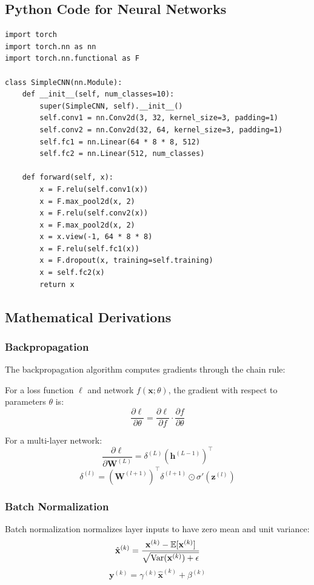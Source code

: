 \documentclass{article}
\begin{document}
\subsection{Python Code for Neural Networks}

\begin{verbatim}
import torch
import torch.nn as nn
import torch.nn.functional as F

class SimpleCNN(nn.Module):
    def __init__(self, num_classes=10):
        super(SimpleCNN, self).__init__()
        self.conv1 = nn.Conv2d(3, 32, kernel_size=3, padding=1)
        self.conv2 = nn.Conv2d(32, 64, kernel_size=3, padding=1)
        self.fc1 = nn.Linear(64 * 8 * 8, 512)
        self.fc2 = nn.Linear(512, num_classes)

    def forward(self, x):
        x = F.relu(self.conv1(x))
        x = F.max_pool2d(x, 2)
        x = F.relu(self.conv2(x))
        x = F.max_pool2d(x, 2)
        x = x.view(-1, 64 * 8 * 8)
        x = F.relu(self.fc1(x))
        x = F.dropout(x, training=self.training)
        x = self.fc2(x)
        return x
\end{verbatim}

\subsection{Mathematical Derivations}

\subsubsection{Backpropagation}

The backpropagation algorithm computes gradients through the chain rule:

For a loss function $\ell$ and network $f(\mathbf{x}; \theta)$, the gradient
with respect to parameters $\theta$ is:
\[
\frac{\partial \ell}{\partial \theta} = \frac{\partial \ell}{\partial f} \cdot \frac{\partial f}{\partial \theta}
\]

For a multi-layer network:
\[
\frac{\partial \ell}{\partial \mathbf{W}^{(L)}} = \delta^{(L)} (\mathbf{h}^{(L-1)})^\top
\]
\[
\delta^{(l)} = (\mathbf{W}^{(l+1)})^\top \delta^{(l+1)} \odot \sigma'(\mathbf{z}^{(l)})
\]

\subsubsection{Batch Normalization}

Batch normalization normalizes layer inputs to have zero mean and unit variance:
\[
\hat{\mathbf{x}}^{(k)} = \frac{\mathbf{x}^{(k)} - \mathbb{E}[\mathbf{x}^{(k)}]}{\sqrt{\mathrm{Var}(\mathbf{x}^{(k)}) + \epsilon}}
\]
\[
\mathbf{y}^{(k)} = \gamma^{(k)} \hat{\mathbf{x}}^{(k)} + \beta^{(k)}
\]
\end{document}
